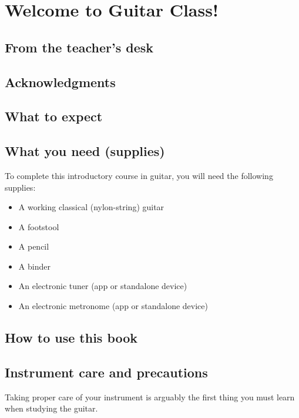 \chapter[Welcome]{Welcome to Guitar Class!}

\section{From the teacher's desk}

\section{Acknowledgments}

\section{What to expect}

\section{What you need (supplies)}

To complete this introductory course in guitar, you will need the following supplies:

\begin{itemize}
	\item A working classical (nylon-string) guitar
	\item A footstool
	\item A pencil
	\item A binder
	\item An electronic tuner (app or standalone device)
	\item An electronic metronome (app or standalone device)
\end{itemize}

\section{How to use this book}

\section{Instrument care and precautions}

Taking proper care of your instrument is arguably the first thing you must learn when studying the guitar.